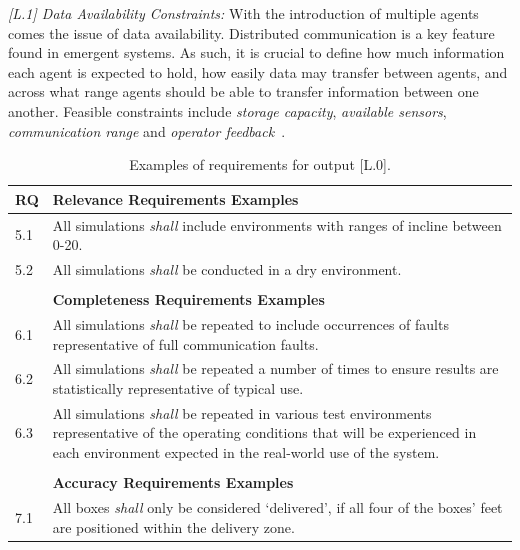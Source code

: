 \documentclass[runningheads]{llncs}
\begin{document}
\emph{[L.1] Data Availability Constraints:}
With the introduction of multiple agents comes the issue of data availability. Distributed communication is a key feature found in emergent systems. As such, it is crucial to define how much information each agent is expected to hold, how easily data may transfer between agents, and across what range agents should be able to transfer information between one another. 
Feasible constraints include \emph{storage capacity}, \emph{available sensors}, \emph{communication range} and \emph{operator feedback}~\cite{Jones2022}.
\begin{table}[!t]%
	\centering
	\caption{Examples of requirements for output [L.0].}
	\vspace{-2ex}
	\label{tab:L0_req}
	\begin{tabular}{p{0.5cm} p{12.9cm}}%
	\textbf{RQ} & \textbf{Relevance Requirements Examples} \\
	\hline
	5.1 & All simulations \emph{shall} include environments with ranges of incline between 0-20\textdegree.\\
	\hline
	5.2 & All simulations \emph{shall} be conducted in a dry environment.\\
	\hline \\[-1.25\medskipamount]
	& \textbf{Completeness Requirements Examples} \\
	\hline
	6.1 & All simulations \emph{shall} be repeated to include occurrences of faults representative of full communication faults.\\
	\hline
	6.2 & All simulations \emph{shall} be repeated a number of times to ensure results are statistically representative of typical use.\\
	\hline
	6.3 & All simulations \emph{shall} be repeated in various test environments representative of the operating conditions that will be experienced in each environment expected in the real-world use of the system.\\
	\hline \\[-1.25\medskipamount]
	& \textbf{Accuracy Requirements Examples} \\
	\hline
	7.1 & All boxes \emph{shall} only be considered `delivered’, if all four of the boxes’ feet are positioned within the delivery zone.\\

\end{tabular}
\end{table}
\end{document}

